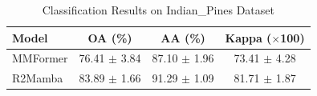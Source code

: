 \begin{table}[htbp]
\centering
\caption{Classification Results on Indian\_Pines Dataset}
\label{tab:indian_pines_results}
\begin{tabular}{lccc}
\toprule
Model & OA (\%) & AA (\%) & Kappa ($\times$100) \\
\midrule
MMFormer & 76.41 $\pm$ 3.84 & 87.10 $\pm$ 1.96 & 73.41 $\pm$ 4.28 \\
R2Mamba & 83.89 $\pm$ 1.66 & 91.29 $\pm$ 1.09 & 81.71 $\pm$ 1.87 \\
\bottomrule
\end{tabular}
\end{table}